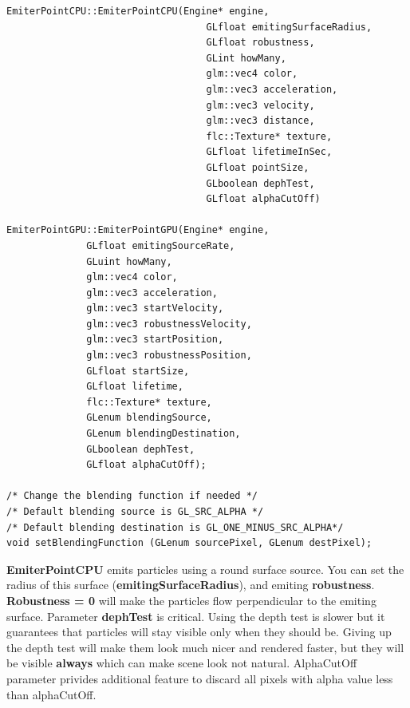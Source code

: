 \documentclass{article}
\begin{document}
\begin{lstlisting}
EmiterPointCPU::EmiterPointCPU(Engine* engine,
                                   GLfloat emitingSurfaceRadius,
                                   GLfloat robustness,
                                   GLint howMany,
                                   glm::vec4 color,
                                   glm::vec3 acceleration,
                                   glm::vec3 velocity,
                                   glm::vec3 distance,
                                   flc::Texture* texture,
                                   GLfloat lifetimeInSec,
                                   GLfloat pointSize,
                                   GLboolean dephTest,
                                   GLfloat alphaCutOff)
                                   
EmiterPointGPU::EmiterPointGPU(Engine* engine,
              GLfloat emitingSourceRate,
              GLuint howMany,
              glm::vec4 color,
              glm::vec3 acceleration,
              glm::vec3 startVelocity,
              glm::vec3 robustnessVelocity,
              glm::vec3 startPosition,
              glm::vec3 robustnessPosition,
              GLfloat startSize,
              GLfloat lifetime,
	          flc::Texture* texture,
	          GLenum blendingSource,
	          GLenum blendingDestination,
	          GLboolean dephTest,
	          GLfloat alphaCutOff);

/* Change the blending function if needed */
/* Default blending source is GL_SRC_ALPHA */
/* Default blending destination is GL_ONE_MINUS_SRC_ALPHA*/
void setBlendingFunction (GLenum sourcePixel, GLenum destPixel);

\end{lstlisting}

\indent \textbf{EmiterPointCPU} emits particles using a round surface source. You can set the radius of this surface (\textbf{emitingSurfaceRadius}), and emiting \textbf{robustness}. \textbf{Robustness = 0} will make the particles flow perpendicular to the emiting surface. Parameter \textbf{dephTest} is critical. Using the depth test is slower but it guarantees that particles will stay visible only when they should be. Giving up the depth test will make them look much nicer and rendered faster, but they will be visible \textbf{always} which can make scene look not natural. AlphaCutOff parameter privides additional feature to discard all pixels with alpha value less than alphaCutOff.

\newpage
\end{document}
